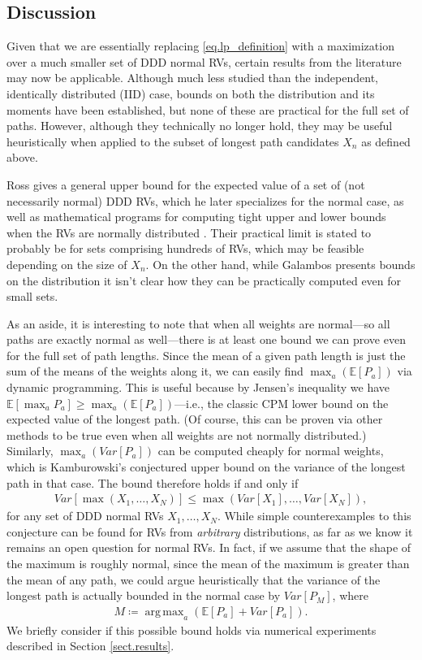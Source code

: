 \documentclass[12pt]{article}
\def\E{\mathbb{E}}
\DeclareMathOperator*{\argmax}{arg\,max}
\begin{document}
\subsection{Discussion}
\label{subsect.discussion}

Given that we are essentially replacing \eqref{eq.lp_definition} with a maximization over a much smaller set of DDD normal RVs, certain results from the literature may now be applicable. Although much less studied than the independent, identically distributed (IID) case, bounds on both the distribution and its moments have been established, but none of these are practical for the full set of paths. However, although they technically no longer hold, they may be useful heuristically when applied to the subset of longest path candidates $X_n$ as defined above.

Ross gives a general upper bound for the expected value of a set of (not necessarily normal) DDD RVs, which he later specializes for the normal case, as well as mathematical programs for computing tight upper and lower bounds when the RVs are normally distributed \cite{ross03}. Their practical limit is stated to probably be for sets comprising hundreds of RVs, which may be feasible depending on the size of $X_n$. On the other hand, while Galambos \cite{gal72} presents bounds on the distribution it isn't clear how they can be practically computed even for small sets.

As an aside, it is interesting to note that when all weights are normal---so all paths are exactly normal as well---there is at least one bound we can prove even for the full set of path lengths. Since the mean of a given path length is just the sum of the means of the weights along it, we can easily find $\max_a(\E[P_a])$ via dynamic programming. This is useful because by Jensen's inequality we have  
  $\E[\max_aP_a] \geq \max_a(\E[P_a])$---i.e., the classic CPM lower bound on the expected value of the longest path. (Of course, this can be proven via other methods to be true even when all weights are not normally distributed.) Similarly, $\max_a(Var[P_a])$ can be computed cheaply for normal weights, which is Kamburowski's conjectured upper bound on the variance of the longest path in that case. The bound therefore holds if and only if
  \begin{align*}
    Var[\max(X_1, \dots, X_N)] \leq \max(Var[X_1], \dots, Var[X_N]),
  \end{align*}
  for any set of DDD normal RVs $X_1, \dots, X_N$. While simple counterexamples to this conjecture can be found for RVs from {\em arbitrary} distributions, as far as we know it remains an open question for normal RVs. In fact, if we assume that the shape of the maximum is roughly normal, since the mean of the maximum is greater than the mean of any path, we could argue heuristically that the variance of the longest path is actually bounded in the normal case by $Var[P_M]$, where   
\begin{align*}
    M \coloneqq \argmax_a(\E[P_a] + Var[P_a]).
 \end{align*}
 We briefly consider if this possible bound holds via numerical experiments described in Section \ref{sect.results}.
  
\end{document}
